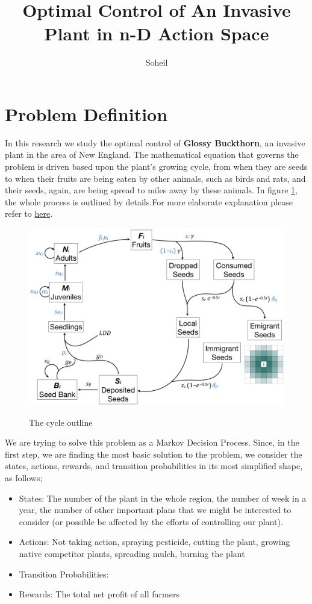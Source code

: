 \documentclass{article}
\title{ Optimal Control of An Invasive Plant in n-D Action Space}
\author{Soheil}
\theoremstyle{remark}
\theoremstyle{remark}
\theoremstyle{remark}
\theoremstyle{remark}
\theoremstyle{remark}
\theoremstyle{remark}
\begin{document}
\maketitle
\section{Problem Definition}
In this research we study the optimal control of \textbf{Glossy Buckthorn}, an invasive plant in the area of New England. The mathematical equation that governs the problem is driven based upon the plant's growing cycle, from when they are seeds to when their fruits are being eaten by other animals, such as birds and rats, and their seeds, again, are being spread to miles away by these animals. In figure \ref{fig:outline}, the whole process is outlined by details.For more elaborate explanation please refer to \href{https://github.com/rlsquared/gbPopMod}{here}.

\begin{figure}
\centering
\includegraphics[scale=.2]{model_outline.jpeg}
\label{fig:outline}
\caption{The cycle outline}
\end{figure}

We are trying to solve this problem as a Markov Decision Process. Since, in the first step, we are finding the most basic solution to the problem, we consider the states, actions, rewards, and transition probabilities in its most simplified shape, as follows;

\begin{itemize}
 \item States: The number of the plant in the whole region, the number of week in a year, the number of other important plans that we might be interested to consider (or possible be affected by the efforts of controlling our plant).
 \item Actions: Not taking action, spraying pesticide, cutting the plant, growing native competitor plants, spreading mulch, burning the plant
 \item Transition Probabilities:
 \item Rewards: The total net profit of all farmers
\end{itemize}
\end{document}
